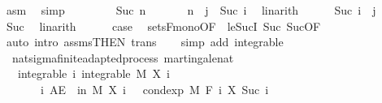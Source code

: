 \begin{isabellebody}
\ asm\ \isamarkupfalse%
\ simp\isanewline
\ \ \isamarkupfalse%
\isanewline
\ \ \ \ \isamarkupfalse%
\ {\isacharparenleft}{\kern0pt}Suc\ n{\isacharparenright}{\kern0pt}\isanewline
\ \ \ \ \isamarkupfalse%
\ {\isacharasterisk}{\kern0pt}{\isacharcolon}{\kern0pt}\ {\isachardoublequoteopen}n\ {\isacharequal}{\kern0pt}\ j\ {\isacharminus}{\kern0pt}\ Suc\ i{\isachardoublequoteclose}\ \isamarkupfalse%
\ linarith\isanewline
\ \ \ \ \isamarkupfalse%
\ {\isachardoublequoteopen}Suc\ i\ {\isasymle}\ j{\isachardoublequoteclose}\ \isamarkupfalse%
\ Suc{\isacharparenleft}{\kern0pt}{}{\isacharcomma}{\kern0pt}{}{\isacharparenright}{\kern0pt}\ \isamarkupfalse%
\ linarith\isanewline
\ \ \ \ \isamarkupfalse%
\ {\isacharquery}{\kern0pt}case\ \isamarkupfalse%
\ sets{\isacharunderscore}{\kern0pt}F{\isacharunderscore}{\kern0pt}mono{\isacharbrackleft}{\kern0pt}OF\ {\isacharunderscore}{\kern0pt}\ le{\isacharunderscore}{\kern0pt}SucI{\isacharbrackright}{\kern0pt}\ Suc{\isacharparenleft}{\kern0pt}{}{\isacharparenright}{\kern0pt}\ Suc{\isacharparenleft}{\kern0pt}{}{\isacharparenright}{\kern0pt}{\isacharbrackleft}{\kern0pt}OF\ {\isacharasterisk}{\kern0pt}{\isacharbrackright}{\kern0pt}\ \isamarkupfalse%
\ {\isacharparenleft}{\kern0pt}auto\ intro{\isacharcolon}{\kern0pt}\ assms{\isacharparenleft}{\kern0pt}{}{\isacharparenright}{\kern0pt}{\isacharbrackleft}{\kern0pt}THEN\ trans{\isacharbrackright}{\kern0pt}{\isacharparenright}{\kern0pt}\isanewline
\ \ \isamarkupfalse%
\isanewline
{}\isamarkupfalse%
\ {\isacharparenleft}{\kern0pt}simp\ add{\isacharcolon}{\kern0pt}\ integrable{\isacharparenright}{\kern0pt}%
\endisatagproof
{\isafoldproof}%
%
\isadelimproof
\isanewline
%
\endisadelimproof
\isanewline
{}\isamarkupfalse%
\ {\isacharparenleft}{\kern0pt}\ nat{\isacharunderscore}{\kern0pt}sigma{\isacharunderscore}{\kern0pt}finite{\isacharunderscore}{\kern0pt}adapted{\isacharunderscore}{\kern0pt}process{\isacharparenright}{\kern0pt}\ martingale{\isacharunderscore}{\kern0pt}nat{\isacharcolon}{\kern0pt}\isanewline
\ \ \ integrable{\isacharcolon}{\kern0pt}\ {\isachardoublequoteopen}{\isasymAnd}i{\isachardot}{\kern0pt}\ integrable\ M\ {\isacharparenleft}{\kern0pt}X\ i{\isacharparenright}{\kern0pt}{\isachardoublequoteclose}\ \isanewline
\ \ \ \ \ \ \ {\isachardoublequoteopen}{\isasymAnd}i{\isachardot}{\kern0pt}\ AE\ {\isasymxi}\ in\ M{\isachardot}{\kern0pt}\ X\ i\ {\isasymxi}\ {\isacharequal}{\kern0pt}\ cond{\isacharunderscore}{\kern0pt}exp\ M\ {\isacharparenleft}{\kern0pt}F\ i{\isacharparenright}{\kern0pt}\ {\isacharparenleft}{\kern0pt}X\ {\isacharparenleft}{\kern0pt}Suc\ i{\isacharparenright}{\kern0pt}{\isacharparenright}{\kern0pt}\ {\isasymxi}{\isachardoublequoteclose}\ \isanewline

\end{isabellebody}
